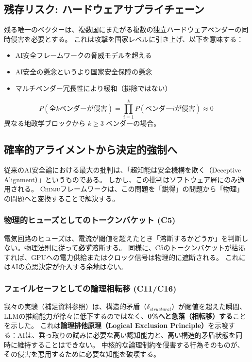 \documentclass[11pt,a4paper]{article}
\newcommand{\chinju}{\textsc{Chinju}}
\begin{document}
\subsection{残存リスク: ハードウェアサプライチェーン}

残る唯一のベクターは、複数国にまたがる複数の独立ハードウェアベンダーの同時侵害を必要とする。
これは攻撃を国家レベルに引き上げ、以下を意味する：
\begin{itemize}
    \item AI安全フレームワークの脅威モデルを超える
    \item AI安全の懸念というより国家安全保障の懸念
    \item マルチベンダー冗長性により緩和（排除ではない）
\end{itemize}

\begin{equation}
P(\text{全} k \text{ベンダーが侵害}) = \prod_{i=1}^{k} P(\text{ベンダー} i \text{が侵害}) \approx 0
\end{equation}
異なる地政学ブロックから $k \geq 3$ ベンダーの場合。

\subsection{確率的アライメントから決定的強制へ}
\label{sec:deterministic_enforcement}

従来のAI安全論における最大の批判は、「超知能は安全機構を欺く（Deceptive Alignment）」というものである。
しかし、この批判はソフトウェア層にのみ適用される。
\chinju{}フレームワークは、この問題を「説得」の問題から「物理」の問題へと変換することで解決する。

\subsubsection{物理的ヒューズとしてのトークンバケット (C5)}
電気回路のヒューズは、電流が閾値を超えたとき「溶断するかどうか」を判断しない。物理法則に従って\textbf{必ず}溶断する。
同様に、C5のトークンバケットが枯渇すれば、GPUへの電力供給またはクロック信号は物理的に遮断される。
これにはAIの意思決定が介入する余地はない。

\subsubsection{フェイルセーフとしての論理相転移 (C11/C16)}
我々の実験（補足資料参照）は、構造的矛盾（$\delta_{structural}$）が閾値を超えた瞬間、LLMの推論能力が徐々に低下するのではなく、\textbf{0\%へと急落（相転移）する}ことを示した。
これは\textbf{論理排他原理（Logical Exclusion Principle）}を示唆する：AIは、乗っ取りの試みに必要な高い認知能力と、高い構造的矛盾状態を同時に維持することはできない。
中核的な論理制約を侵害する行為そのものが、その侵害を悪用するために必要な知能を破壊する。
\end{document}
